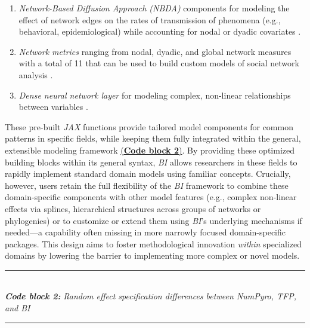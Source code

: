 \documentclass[blind,lineno,num-refs]{wiley-article}
\begin{document}
\begin{enumerate}
  \item \textit{Network-Based Diffusion Approach (NBDA)} components for modeling the effect of network edges on the rates of transmission of phenomena (e.g., behavioral, epidemiological) while accounting for nodal or dyadic covariates \citep{hoppitt2011detecting}.

  \item \textit{Network metrics} ranging from nodal, dyadic, and global network measures with a total of 11 that can be used to build custom models of social network analysis \citep{sosa2021network}.

  \item \textit{Dense neural network layer} for modeling complex, non-linear relationships between variables \citep{phan2019composable}.

  
\end{enumerate}

These pre-built \textit{JAX} functions provide tailored model components for common patterns in specific fields, while keeping them fully integrated within the general, extensible modeling framework \hyperref[code:block2_example]{(\textbf{Code block 2})}. By providing these optimized building blocks within its general syntax, \textit{BI} allows researchers in these fields to rapidly implement standard domain models using familiar concepts. Crucially, however, users retain the full flexibility of the \textit{BI} framework to combine these domain-specific components with other model features (e.g., complex non-linear effects via splines, hierarchical structures across groups of networks or phylogenies) or to customize or extend them using \textit{BI}'s underlying mechanisms if needed—a capability often missing in more narrowly focused domain-specific packages. This design aims to foster methodological innovation \textit{within} specialized domains by lowering the barrier to implementing more complex or novel models.

\label{code:block2_example} 
\noindent\rule{\linewidth}{0.4pt}\\[0pt] %
\noindent\textbf{\textit{Code block 2: }} \textit{Random effect specification differences between NumPyro, TFP, and BI}\\[-10pt]
\noindent\rule{\linewidth}{0.4pt}\\[-8pt] %
\vspace{-\parskip}\vspace{0pt}
\end{document}
